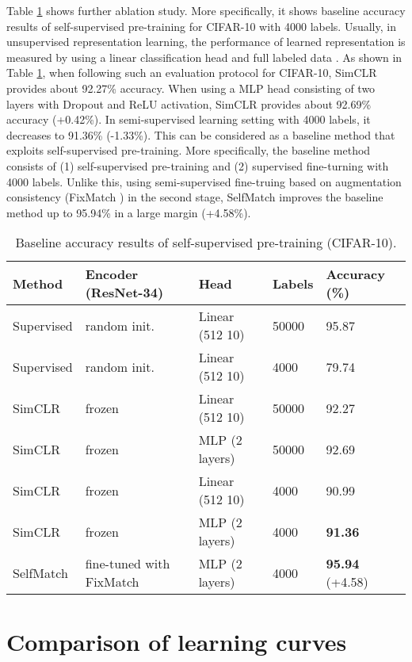 \documentclass{article}
\begin{document}
Table \ref{table:further-ablation-study} shows further ablation study. More specifically, it shows baseline accuracy results of self-supervised pre-training for CIFAR-10 \cite{krizhevsky2009learning} with 4000 labels. Usually, in unsupervised representation learning, the performance of learned representation is measured by using a linear classification head and full labeled data \cite{chen2020simple}. As shown in Table \ref{table:further-ablation-study}, when following such an evaluation protocol for CIFAR-10, SimCLR \cite{chen2020simple} provides about 92.27\% accuracy. When using a MLP head consisting of two layers with Dropout \cite{srivastava2014dropout} and ReLU activation, SimCLR provides about 92.69\% accuracy (+0.42\%). In semi-supervised learning setting with 4000 labels, it decreases to 91.36\% (-1.33\%). This can be considered as a baseline method that exploits self-supervised pre-training. More specifically, the baseline method consists of (1) self-supervised pre-training and (2) supervised fine-turning with 4000 labels. Unlike this, using semi-supervised fine-truing based on augmentation consistency (FixMatch \cite{sohn2020fixmatch}) in the second stage, SelfMatch improves the baseline method up to 95.94\% in a large margin (+4.58\%).

\begin{table}[h]
    \caption{Baseline accuracy results of self-supervised pre-training (CIFAR-10).}
    \label{table:further-ablation-study}
    
    \centering
    \begin{tabular}{m{1.5cm} lll l}
        \toprule
        \textbf{Method} & \textbf{Encoder} (ResNet-34) & \textbf{Head} & \textbf{Labels} & \textbf{Accuracy} (\%) \\

        \hline
        \noalign{\smallskip}
        Supervised & random init. & Linear (512  10) & 50000 & 95.87 \\
        Supervised & random init. & Linear (512  10) & 4000 & 79.74 \\
        
        \hline
        \noalign{\smallskip}
        SimCLR & frozen & Linear (512  10) & 50000 & 92.27 \\
        SimCLR & frozen & MLP (2 layers) & 50000 & 92.69 \\
        SimCLR & frozen & Linear (512  10) & 4000 & 90.99 \\
        SimCLR & frozen & MLP (2 layers) & 4000 & \textbf{91.36} \\
        
        \hline
        \noalign{\smallskip}
        SelfMatch & fine-tuned with FixMatch & MLP (2 layers) & 4000 & \textbf{95.94} (+4.58) \\
        
        \bottomrule     
    \end{tabular}
\end{table} \section{Comparison of learning curves}
\label{app:comparison-of-learning-curves}
\end{document}
